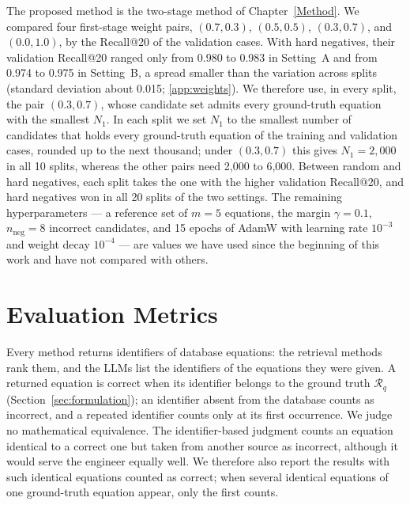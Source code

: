 The proposed method is the two-stage method of Chapter~\ref{Method}. We compared four first-stage
weight pairs, $(0.7, 0.3)$, $(0.5, 0.5)$, $(0.3, 0.7)$, and $(0.0, 1.0)$, by the Recall@20 of the
validation cases. With hard negatives, their validation Recall@20 ranged only from 0.980 to 0.983
in Setting~A and from 0.974 to 0.975 in Setting~B, a spread smaller than the variation across
splits (standard deviation about 0.015; \ref{app:weights}). We therefore use, in every split, the pair $(0.3, 0.7)$, whose
candidate set admits every ground-truth equation with the smallest $N_1$. In each split we set
$N_1$ to the smallest number of candidates that holds every ground-truth equation of the training
and validation cases, rounded up to the next thousand; under $(0.3, 0.7)$ this gives
$N_1 = 2{,}000$ in all 10 splits, whereas the other pairs need 2,000 to 6,000. Between random and
hard negatives, each split takes the one with the higher validation Recall@20, and hard negatives
won in all 20 splits of the two settings. The remaining hyperparameters --- a reference set of
$m = 5$ equations, the margin $\gamma = 0.1$, $n_{\mathrm{neg}} = 8$ incorrect candidates, and 15
epochs of AdamW with learning rate $10^{-3}$ and weight decay $10^{-4}$ --- are values we have used
since the beginning of this work and have not compared with others.

\section{Evaluation Metrics}
\label{sec:metrics}

Every method returns identifiers of database equations: the retrieval methods rank them, and the
LLMs list the identifiers of the equations they were given. A returned equation is correct when its
identifier belongs to the ground truth $\mathcal{R}_q$ (Section~\ref{sec:formulation}); an
identifier absent from the database counts as incorrect, and a repeated identifier counts only at
its first occurrence. We judge no mathematical equivalence. The identifier-based judgment counts an
equation identical to a correct one but taken from another source as incorrect, although it would
serve the engineer equally well. We therefore also report the results with such identical equations
counted as correct; when several identical equations of one ground-truth equation appear, only the
first counts.

